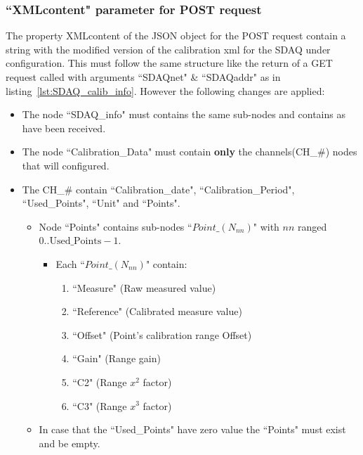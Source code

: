 \subsubsection{``XMLcontent" parameter for POST request}
\label{subsubsec:post_xml_contents}
The property XMLcontent of the JSON object for the POST request contain a string with the modified version of the calibration xml for the SDAQ under configuration.
This must follow the same structure like the return of a GET request called with arguments ``SDAQnet" \& ``SDAQaddr" as in listing~\ref{lst:SDAQ_calib_info}.
However the following changes are applied:
\begin{itemize}
	\item The node ``SDAQ\_info" must contains the same sub-nodes and contains as have been received.
	\item The node ``Calibration\_Data" must contain \textbf{only} the channels(CH\_\#) nodes that will configured.
	\item The CH\_\# contain ``Calibration\_date", ``Calibration\_Period", ``Used\_Points", ``Unit" and ``Points".
		\begin{itemize}
			\item Node ``Points" contains sub-nodes ``$Point\_(N_{nn})$" with $nn$ ranged $0..\text{Used\_Points}-1$.
			\begin{itemize}
				\item Each ``$Point\_(N_{nn})$" contain:
				\begin{enumerate}
					\item ``Measure" (Raw measured value)
					\item ``Reference" (Calibrated measure value)
					\item ``Offset" (Point's calibration range Offset)
					\item ``Gain" (Range gain)
					\item ``C2" (Range $x^2$ factor)
					\item ``C3" (Range $x^3$ factor)
				\end{enumerate}
			\end{itemize}
			\item In case that the ``Used\_Points" have zero value the ``Points" must exist and be empty.
		\end{itemize}
\end{itemize}
